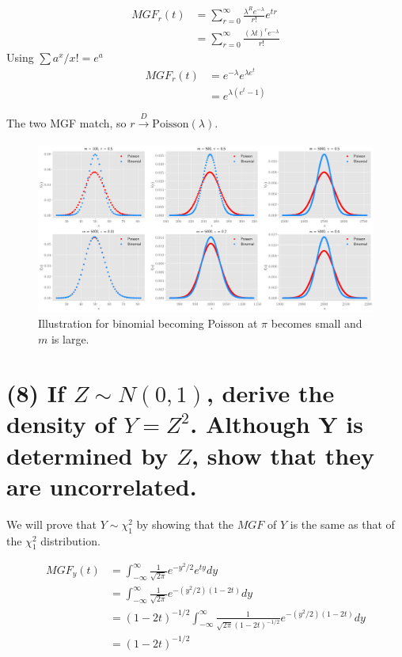 \documentclass[11pt]{article}
\begin{document}
\begin{align*}
    MGF_r(t) &=  \sum_{r=0}^{\infty} \frac{\lambda^Re^{-\lambda}}{r!}e^{tr}\\
    &=  \sum_{r=0}^{\infty} \frac{(\lambda t)^r e^{-\lambda}}{r!}
\end{align*}
Using $\sum a^x/x! = e^a$
\begin{align*}
    MGF_r(t) &= e^{-\lambda} e^{\lambda e^t}\\
    &= e^{\lambda(e^t-1)}
\end{align*}

The two MGF match, so $r \xrightarrow[]{D}
\text{Poisson}(\lambda)$.


\begin{figure}[!h]
    \centering
    \includegraphics[scale=.35]{homework_1/third_hist.png}
    \caption{Illustration for binomial becoming Poisson at $\pi$ becomes small and $m$ is large.}
    \label{fig:my_label}
\end{figure}


\section*{(8) If $Z \sim N(0, 1)$, derive the density of $Y=Z^2$. Although Y is
determined by $Z$, show that they are uncorrelated.}
We will prove that $Y \sim \chi^2_1$ by showing that the $MGF$ of $Y$ is the same as that of the $\chi^2_1$ distribution.




 \begin{align*}
     MGF_y(t) &= \int_{-\infty}^{\infty} \frac{1}{\sqrt{2\pi}}e^{-y^2/2}e^{ty}dy\\
     &= \int_{-\infty}^{\infty} \frac{1}{\sqrt{2\pi}}e^{-(y^2/2)(1-2t)}dy\\
     &= (1-2t)^{-1/2}\int_{-\infty}^{\infty} \frac{1}{\sqrt{2\pi}(1-2t)^{-1/2}}e^{-(y^2/2)(1-2t)}dy\\
     &= (1-2t)^{-1/2}
 \end{align*}
 
\end{document}
